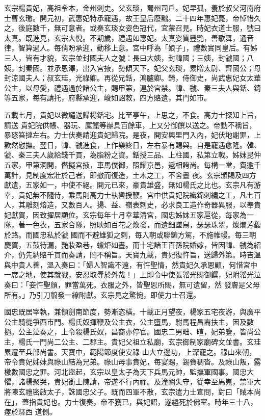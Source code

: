 \begin{pinyinscope}
 玄宗楊貴妃，高祖令本，金州刺史。父玄琰，蜀州司戶。妃早孤，養於叔父河南府士曹玄璬。開元初，武惠妃特承寵遇，故王皇后廢黜。二十四年惠妃薨，帝悼惜久之，後庭數千，無可意者。或奏玄琰女姿色冠代，宜蒙召見。時妃衣道士服，號曰太真。既進見，玄宗大悅。不期歲，禮遇如惠妃。太真姿質豐艷，善歌舞，通音律，智算過人。每倩盼承迎，動移上意。宮中呼為「娘子」，禮數實同皇后。有姊
 三人，皆有才貌，玄宗並封國夫人之號：長曰大姨，封韓國；三姨，封虢國；八姨，封秦國。並承恩澤，出入宮掖，勢傾天下。妃父玄琰，累贈太尉、齊國公；母封涼國夫人；叔玄珪，光祿卿。再從兄銛，鴻臚卿。錡，侍御史，尚武惠妃女太華公主，以母愛，禮遇過於諸公主，賜甲第，連於宮禁。韓、虢、秦三夫人與銛、錡等五家，每有請托，府縣承迎，峻如詔敕，四方賂遺，其門如市。



 五載七月，貴妃以微譴送歸楊銛宅。比至亭午，上思之，不食。高力士探知上旨，請送
 貴妃院供帳、器玩、廩餼等辦具百餘車，上又分御饌以送之。帝動不稱旨，暴怒笞撻左右。力士伏奏請迎貴妃歸院。是夜，開安興里門入內，妃伏地謝罪，上歡然慰撫。翌日，韓、虢進食，上作樂終日，左右暴有賜與。自是寵遇愈隆。韓、虢、秦三夫人歲給錢千貫，為脂粉之資。銛授三品、上柱國，私第立戟。姊妹昆仲五家，甲第洞開，僭擬宮掖，車馬僕御，照耀京邑，遞相誇尚。每構一堂，費逾千萬計，見制度宏壯於己者，即撤而復造，土木之工，不舍晝
 夜。玄宗頒賜及四方獻遺，五家如一，中使不絕。開元已來，豪貴雄盛，無如楊氏之比也。玄宗凡有游幸，貴妃無不隨侍，乘馬則高力士執轡授鞭。宮中供貴妃院織錦刺繡之工，凡七百人，其雕刻熔造，又數百人。揚、益、嶺表刺史，必求良工造作奇器異服，以奉貴妃獻賀，因致擢居顯位。玄宗每年十月幸華清宮，國忠姊妹五家扈從，每家為一隊，著一色衣，五家合隊，照映如百花之煥發，而遺鈿墜舄，瑟瑟珠翠，燦爛芳馥於路。而國忠私於虢
 國而不避雄狐之刺，每入朝或聯鑣方駕，不施帷幔。每三朝慶賀，五鼓待漏，艷妝盈巷，蠟炬如晝。而十宅諸王百孫院婚嫁，皆因韓、虢為紹介，仍先納賂千貫而奏請，罔不稱旨。天寶九載，貴妃復忤旨，送歸外第。時吉溫與中貴人善，溫入奏曰：「婦人智識不遠，有忤聖情，然貴妃久承恩顧，何惜宮中一席之地，使其就戮，安忍取辱於外哉！」上即令中使張韜光賜御饌，妃附韜光泣奏曰：「妾忤聖顏，罪當萬死。衣服之外，皆聖恩所賜，無可遺留，然
 發膚是父母所有。」乃引刀翦發一繚附獻。玄宗見之驚惋，即使力士召還。



 國忠既居宰執，兼領劍南節度，勢漸恣橫。十載正月望夜，楊家五宅夜游，與廣平公主騎從爭西市門。楊氏奴揮鞭及公主衣，公主墮馬，駙馬程昌裔扶主，因及數撾。公主泣奏之，上令殺楊氏奴，昌裔亦停官。國忠二男昢、暄，妃弟鑒，皆尚公主，楊氏一門尚二公主、二郡主。貴妃父祖立私廟，玄宗御制家廟碑文並書。玄珪累遷至兵部尚書。天寶中，範陽節度使安祿
 山大立邊功，上深寵之。祿山來朝，帝令貴妃姊妹與祿山結為兄弟。祿山母事貴妃，每宴賜，錫賚稠沓。及祿山叛，露檄數國忠之罪。河北盜起，玄宗以皇太子為天下兵馬元帥，監撫軍國事。國忠大懼，諸楊聚哭，貴妃銜土陳請，帝遂不行內禪。及潼關失守，從幸至馬嵬，禁軍大將陳玄禮密啟太子，誅國忠父子。既而四軍不散，玄宗遣力士宣問，對曰「賊本尚在」，蓋指貴妃也。力士復奏，帝不獲已，與妃詔，遂縊死於佛室。時年三十八，瘞於驛西
 道側。




\end{pinyinscope}
